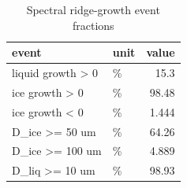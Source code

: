 \begin{table}[htbp]
\centering
\small
\caption{Spectral ridge-growth event fractions}
\label{tab:growth_bundle_events}
\begin{tabular}{llr}
\toprule
event & unit & value \\
\midrule
liquid growth > 0 & \% & 15.3 \\
ice growth > 0 & \% & 98.48 \\
ice growth < 0 & \% & 1.444 \\
D\_ice >= 50 um & \% & 64.26 \\
D\_ice >= 100 um & \% & 4.889 \\
D\_liq >= 10 um & \% & 98.93 \\
\bottomrule
\end{tabular}

\end{table}
